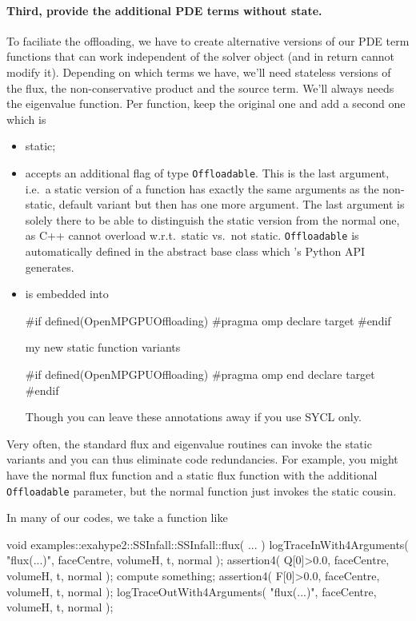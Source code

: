 \paragraph{Third, provide the additional PDE terms without state.}
%
%
To faciliate the offloading, we have to create alternative versions of our PDE
term functions that can work independent of the solver object (and in return
cannot modify it).
Depending on which terms we have, we'll need stateless versions of the flux, the
non-conservative product and the source term. 
We'll always needs the eigenvalue function. 
Per function, keep the original one and add a second one which is 

\begin{itemize}
  \item static;
  \item accepts an additional flag of type \texttt{Offloadable}. This is the last argument, i.e.~a static
  version of a function has exactly the same arguments as the non-static,
  default variant but then has one more argument. The last argument is solely
  there to be able to distinguish the static version from the normal one, as C++
  cannot overload w.r.t.~static vs.~not static. \texttt{Offloadable} is
  automatically defined in the abstract base class which \ExaHyPE's Python API
  generates.
  \item is embedded into 
\begin{code}
#if defined(OpenMPGPUOffloading)
#pragma omp declare target
#endif

my new static function variants

#if defined(OpenMPGPUOffloading)
#pragma omp end declare target
#endif
\end{code}
  Though you can leave these annotations away if you use SYCL only.  
\end{itemize}

\noindent
Very often, the standard flux and eigenvalue routines can invoke the
static variants and you can thus eliminate code redundancies.
For example, you might have the normal flux function and a static flux function
with the additional \texttt{Offloadable} parameter, but the 
normal function just invokes the static cousin.

In many of our codes, we take a function like
\begin{code}
void examples::exahype2::SSInfall::SSInfall::flux(
 ...
)  {
  logTraceInWith4Arguments( "flux(...)", faceCentre, volumeH, t, normal );
  assertion4( Q[0]>0.0, faceCentre, volumeH, t, normal );
  compute something;
  assertion4( F[0]>0.0, faceCentre, volumeH, t, normal );
  logTraceOutWith4Arguments( "flux(...)", faceCentre, volumeH, t, normal );
}
\end{code}

